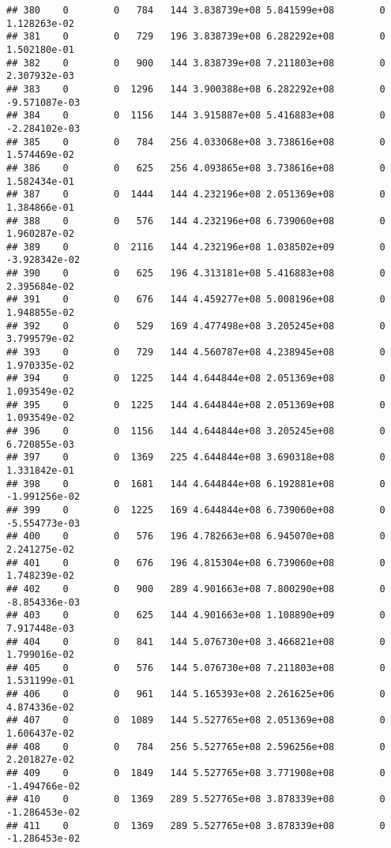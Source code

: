 \documentclass[
]{article}
\begin{document}
\begin{enumerate}
\begin{verbatim}
## 380    0        0   784   144 3.838739e+08 5.841599e+08        0  1.128263e-02
## 381    0        0   729   196 3.838739e+08 6.282292e+08        0  1.502180e-01
## 382    0        0   900   144 3.838739e+08 7.211803e+08        0  2.307932e-03
## 383    0        0  1296   144 3.900388e+08 6.282292e+08        0 -9.571087e-03
## 384    0        0  1156   144 3.915887e+08 5.416883e+08        0 -2.284102e-03
## 385    0        0   784   256 4.033068e+08 3.738616e+08        0  1.574469e-02
## 386    0        0   625   256 4.093865e+08 3.738616e+08        0  1.582434e-01
## 387    0        0  1444   144 4.232196e+08 2.051369e+08        0  1.384866e-01
## 388    0        0   576   144 4.232196e+08 6.739060e+08        0  1.960287e-02
## 389    0        0  2116   144 4.232196e+08 1.038502e+09        0 -3.928342e-02
## 390    0        0   625   196 4.313181e+08 5.416883e+08        0  2.395684e-02
## 391    0        0   676   144 4.459277e+08 5.008196e+08        0  1.948855e-02
## 392    0        0   529   169 4.477498e+08 3.205245e+08        0  3.799579e-02
## 393    0        0   729   144 4.560787e+08 4.238945e+08        0  1.970335e-02
## 394    0        0  1225   144 4.644844e+08 2.051369e+08        0  1.093549e-02
## 395    0        0  1225   144 4.644844e+08 2.051369e+08        0  1.093549e-02
## 396    0        0  1156   144 4.644844e+08 3.205245e+08        0  6.720855e-03
## 397    0        0  1369   225 4.644844e+08 3.690318e+08        0  1.331842e-01
## 398    0        0  1681   144 4.644844e+08 6.192881e+08        0 -1.991256e-02
## 399    0        0  1225   169 4.644844e+08 6.739060e+08        0 -5.554773e-03
## 400    0        0   576   196 4.782663e+08 6.945070e+08        0  2.241275e-02
## 401    0        0   676   196 4.815304e+08 6.739060e+08        0  1.748239e-02
## 402    0        0   900   289 4.901663e+08 7.800290e+08        0 -8.854336e-03
## 403    0        0   625   144 4.901663e+08 1.108890e+09        0  7.917448e-03
## 404    0        0   841   144 5.076730e+08 3.466821e+08        0  1.799016e-02
## 405    0        0   576   144 5.076730e+08 7.211803e+08        0  1.531199e-01
## 406    0        0   961   144 5.165393e+08 2.261625e+06        0  4.874336e-02
## 407    0        0  1089   144 5.527765e+08 2.051369e+08        0  1.606437e-02
## 408    0        0   784   256 5.527765e+08 2.596256e+08        0  2.201827e-02
## 409    0        0  1849   144 5.527765e+08 3.771908e+08        0 -1.494766e-02
## 410    0        0  1369   289 5.527765e+08 3.878339e+08        0 -1.286453e-02
## 411    0        0  1369   289 5.527765e+08 3.878339e+08        0 -1.286453e-02

\end{verbatim}
\end{enumerate}
\end{document}
